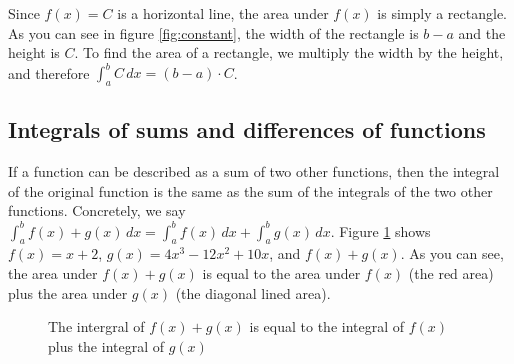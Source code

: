 Since $f(x) = C$ is a horizontal line, the area under $f(x)$ is simply 
a rectangle. As you can see in figure \ref{fig:constant}, the width of 
the rectangle is $b - a$ and the height is $C$. To find the area of a 
rectangle, we multiply the width by the height, and therefore $\int_a^b 
C\,dx = (b - a)\cdot C$.

\subsection{Integrals of sums and differences of functions}
If a function can be described as a sum of two other functions, then 
the integral of the original function is the same as the sum of the 
integrals of the two other functions. Concretely, we say $\int_a^b 
f(x) + g(x)\,dx = \int_a^b f(x)\,dx + \int_a^b g(x)\,dx$. Figure 
\ref{fig:intsum} shows $f(x) = x + 2$, $g(x) = 4x^3-12x^2+10x$, and 
$f(x) + g(x)$. As you can see, the area under $f(x) + g(x)$ is equal 
to the area under $f(x)$ (the red area) plus the area under $g(x)$ 
(the diagonal lined area). 

\begin{figure}[htbp]
    \centering
    \caption{The intergral of $f(x) + g(x)$ is equal to the integral 
    of $f(x)$ plus the integral of $g(x)$}
    \label{fig:intsum}
\end{figure}

